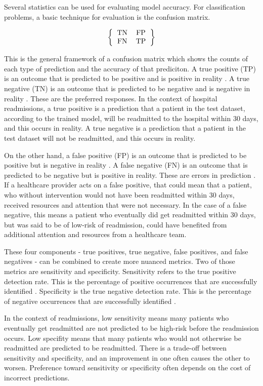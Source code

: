 \documentclass[sigconf]{acmart}
\begin{document}
Several statistics can be used for evaluating model accuracy. For classification problems, a basic technique for evaluation is the confusion matrix.

\[ 
\left \{
  \begin{tabular}{ccc}
  TN & FP \\
  FN & TP 
  \end{tabular}
\right \}
\]

This is the general framework of a confusion matrix which shows the counts of each type of prediction and the accuracy of that prediciton. A true positive (TP) is an outcome that is predicted to be positive and is positive in reality \cite{cite12}. A true negative (TN) is an outcome that is predicted to be negative and is negative in reality \cite{cite12}. These are the preferred responses. In the context of hospital readmissions, a true positive is a prediction that a patient in the test dataset, according to the trained model, will be readmitted to the hospital within 30 days, and this occurs in reality. A true negative is a prediction that a patient in the test dataset will not be readmitted, and this occurs in reality.

On the other hand, a false positive (FP) is an outcome that is predicted to be positive but is negative in reality \cite{cite12}. A false negative (FN) is an outcome that is predicted to be negative but is positive in reality. These are errors in prediction \cite{cite12}. If a healthcare provider acts on a false positive, that could mean that a patient, who without intervention would not have been readmitted within 30 days, received resources and attention that were not necessary. In the case of a false negative, this means a patient who eventually did get readmitted within 30 days, but was said to be of low-risk of readmission, could have benefited from additional attention and resources from a healthcare team.

These four components - true positives, true negative, false positives, and false negatives - can be combined to create more nuanced metrics. Two of those metrics are sensitivity and specificity. Sensitivity refers to the true positive detection rate. This is the percentage of positive occurrences that are successfully identified \cite{cite12}. Specificity is the true negative detection rate. This is the percentage of negative occurrences that are successfully identified \cite{cite12}.

In the context of readmissions, low sensitivity means many patients who eventually get readmitted are not predicted to be high-risk before the readmission occurs. Low specifity means that many patients who would not otherwise be readmitted are predicted to be readmitted. There is a trade-off between sensitivity and specificity, and an improvement in one often causes the other to worsen. Preference toward sensitivity or specificity often depends on the cost of incorrect predictions.
\end{document}
